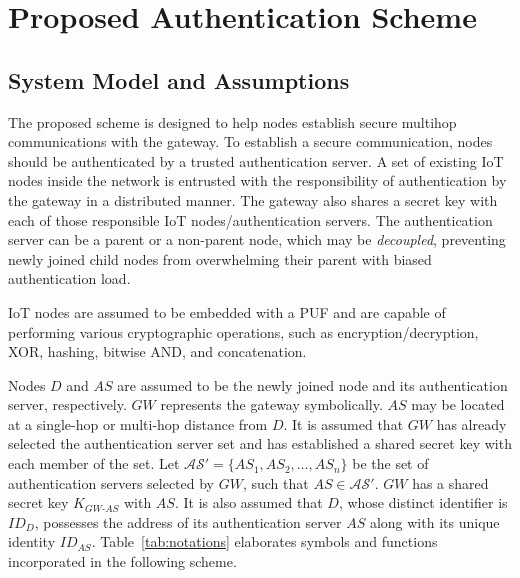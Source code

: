 \chapter{Proposed Authentication Scheme}
\label{ch:proposed}

\section{System Model and Assumptions}

The proposed scheme is designed to help nodes establish secure multihop
communications with the gateway.
To establish a secure communication, nodes should be authenticated by a trusted
authentication server.
A set of existing IoT nodes inside the network is entrusted with the responsibility
of authentication by the gateway in a distributed manner.
The gateway also shares a secret key with each of those responsible IoT
nodes/authentication servers.
The authentication server can be a parent or a non-parent node, which may be
\emph{decoupled}, preventing newly joined child nodes from overwhelming their parent
with biased authentication load.

IoT nodes are assumed to be embedded with a PUF and are capable of performing
various cryptographic operations, such as encryption/decryption, XOR, hashing,
bitwise AND, and concatenation.

Nodes $D$ and $AS$ are assumed to be the newly joined node and its authentication
server, respectively.
$GW$ represents the gateway symbolically.
$AS$ may be located at a single-hop or multi-hop distance from $D$.
It is assumed that $GW$ has already selected the authentication server set and has
established a shared secret key with each member of the set.
Let $\mathcal{AS}' = \{AS_1, AS_2, \ldots, AS_n\}$ be the set of authentication
servers selected by $GW$, such that $AS \in \mathcal{AS}'$.
$GW$ has a shared secret key $K_{GW\text{-}AS}$ with $AS$.
It is also assumed that $D$, whose distinct identifier is $ID_D$, possesses the
address of its authentication server $AS$ along with its unique identity $ID_{AS}$.
Table~\ref{tab:notations} elaborates symbols and functions incorporated in the
following scheme.

